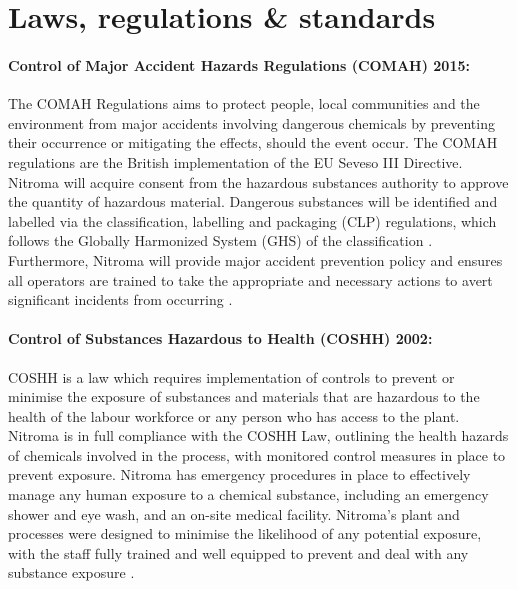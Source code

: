 \section{Laws, regulations \& standards}

\paragraph{Control of Major Accident Hazards Regulations (COMAH) 2015:} 

The COMAH Regulations aims to protect people, local communities and the environment from major accidents involving dangerous chemicals by preventing their occurrence or mitigating the effects, should the event occur. The COMAH regulations are the British implementation of the EU Seveso III Directive. Nitroma will acquire consent from the hazardous substances authority to approve the quantity of hazardous material. Dangerous substances will be identified and labelled via the classification, labelling and packaging (CLP) regulations, which follows the Globally Harmonized System (GHS) of the classification \cite{health_and_safety_executive_chemical_nodate}. Furthermore, Nitroma will provide major accident prevention policy and ensures all operators are trained to take the appropriate and necessary actions to avert significant incidents from occurring \cite{health_and_safety_executive_understanding_2015}. 

\paragraph{Control of Substances Hazardous to Health (COSHH) 2002:}

COSHH is a law which requires implementation of controls to prevent or minimise the exposure of substances and materials that are hazardous to the health of the labour workforce or any person who has access to the plant. Nitroma is in full compliance with the COSHH Law, outlining the health hazards of chemicals involved in the process, with monitored control measures in place to prevent exposure. Nitroma has emergency procedures in place to effectively manage any human exposure to a chemical substance, including an emergency shower and eye wash, and an on-site medical facility. Nitroma’s plant and processes were designed to minimise the likelihood of any potential exposure, with the staff fully trained and well equipped to prevent and deal with any substance exposure \cite{health_and_safety_executive_control_nodate}. 

